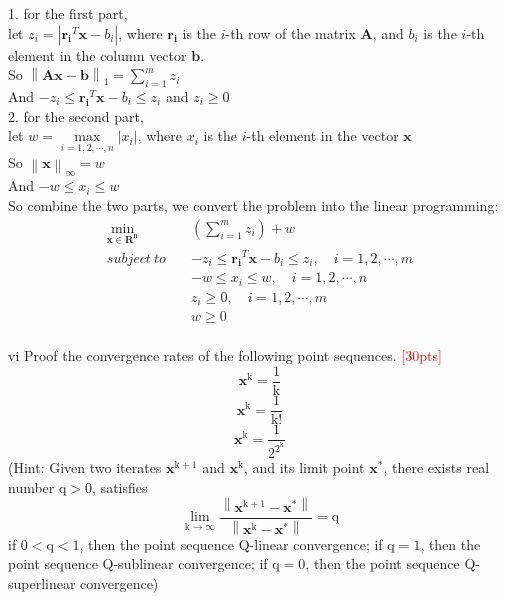     1. for the first part,\\
    let $z_i = |\mathbf{r_i}^T\mathbf{x}-b_i|$, where $\mathbf{r_i}$ is the $i$-th row of the matrix $\mathbf{A}$, and $b_i$ is the $i$-th element in the column vector $\mathbf{b}$.\\
    So $\left\|\mathbf{Ax}-\mathbf{b}\right\|_1=\sum\limits_{i=1}^m z_i$\\
    And $-z_i \leq \mathbf{r_i}^T\mathbf{x}-b_i \leq z_i$ and $z_i \geq 0$\\

    2. for the second part,\\
    let $w = \max\limits_{i=1,2,\cdots,n}|x_i|$, where $x_i$ is the $i$-th element in the vector $\mathbf{x}$\\
    So $\left\|\mathbf{x}\right\|_\infty=w$\\
    And $-w \leq x_i \leq w$\\
    
    So combine the two parts, we convert the problem into the linear programming:\\
    \begin{equation*}
        \begin{aligned}
            \min_{\mathbf{x}\in\mathbf{R^{n}}}\quad & (\sum\limits_{i=1}^m z_i) + w\\
            subject\ to \quad & -z_i \leq \mathbf{r_i}^T\mathbf{x}-b_i \leq z_i, \quad i=1,2,\cdots,m\\
            & -w \leq x_i\leq w, \quad i=1,2,\cdots,n\\
            & z_i \geq 0, \quad i=1,2,\cdots,m\\
            & w\geq 0\\
        \end{aligned}
    \end{equation*}


\newpage
\begin{problem}{vi}
Proof the convergence rates of the following point sequences.
\textcolor{red}{[30pts]}$$\mathbf{x^{\mathrm{k}}}=\frac{\mathrm{1}}{\mathrm{k}}$$$$\mathbf{x^{\mathrm{k}}}=\frac{\mathrm{1}}{\mathrm{k!}}$$$$\mathbf{x^{\mathrm{k}}}=\frac{\mathrm{1}}{\mathrm{2^{2^{k}}}}$$(Hint: Given two iterates $\mathbf{x^{\mathrm{k+1}}}$ and $\mathbf{x^{\mathrm{k}}}$, and its limit point $\mathbf{x^{\mathrm{*}}}$, there exists real number $\mathrm{q > 0}$, satisfies $$\lim_{\mathrm{k\rightarrow\infty}}\frac{\left\|\mathbf{x^{\mathrm{k+1}}}-\mathbf{x^{\mathrm{*}}}\right\|}{\left\|\mathbf{x^{\mathrm{k}}}-\mathbf{x^{\mathrm{*}}}\right\|} = \mathrm{q}$$ if $\mathrm{0<q<1}$, then the point sequence Q-linear convergence; if $\mathrm{q=1}$, then the point sequence Q-sublinear convergence; if $\mathrm{q=0}$, then the point sequence Q-superlinear convergence)
\end{problem}

